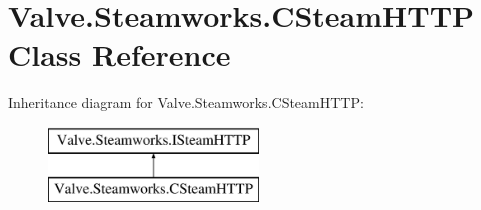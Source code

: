 \hypertarget{classValve_1_1Steamworks_1_1CSteamHTTP}{}\section{Valve.\+Steamworks.\+C\+Steam\+H\+T\+T\+P Class Reference}
\label{classValve_1_1Steamworks_1_1CSteamHTTP}
Inheritance diagram for Valve.\+Steamworks.\+C\+Steam\+H\+T\+T\+P\+:\begin{figure}[H]
\begin{center}
\leavevmode
\includegraphics[height=2.000000cm]{classValve_1_1Steamworks_1_1CSteamHTTP}
\end{center}
\end{figure}
